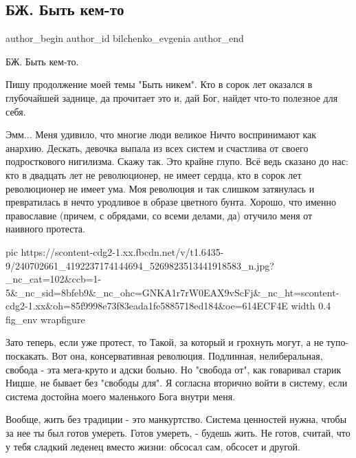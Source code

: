  
 
 
 
 
 
\subsection{БЖ. Быть кем-то}
\label{sec:27_08_2021.fb.bilchenko_evgenia.2.bytj_kem_to}
 
\ifcmt
 author_begin
   author_id bilchenko_evgenia
 author_end
\fi

БЖ. Быть кем-то.

Пишу продолжение моей темы "Быть никем". Кто в сорок лет оказался в глубочайшей
заднице, да прочитает это и, дай Бог, найдет что-то полезное для себя. 

Эмм... Меня удивило, что многие люди великое Ничто воспринимают как анархию.
Дескать, девочка выпала из всех систем и счастлива от своего подросткового
нигилизма. Скажу так. Это крайне глупо. Всё ведь сказано до нас: кто в двадцать
лет не революционер, не имеет сердца, кто в сорок лет революционер не имеет
ума. Моя революция и так слишком затянулась и превратилась в нечто уродливое в
образе цветного бунта. Хорошо, что именно православие (причем, с обрядами, со
всеми делами, да) отучило меня от наивного протеста.

\ifcmt
  pic https://scontent-cdg2-1.xx.fbcdn.net/v/t1.6435-9/240702661_4192237174144694_5269823513441918583_n.jpg?_nc_cat=102&ccb=1-5&_nc_sid=8bfeb9&_nc_ohc=GNKA1r7rW0EAX9vScFj&_nc_ht=scontent-cdg2-1.xx&oh=85f9998e73f83eada1fe5885718ed184&oe=614ECF4E
  width 0.4
	fig_env wrapfigure
\fi

Зато теперь, если уже протест, то Такой, за который и грохнуть могут, а не
тупо-поскакать. Вот она, консервативная революция. Подлинная, нелиберальная,
свобода - эта мега-круто и адски больно. Но "свобода от", как говаривал старик
Ницше, не бывает без "свободы для". Я согласна вторично войти в систему, если
система достойна моего маленького Бога внутри меня. 

Вообще, жить без традиции - это манкуртство. Система ценностей нужна, чтобы за
нее ты был готов умереть. Готов умереть, - будешь жить. Не готов, считай, что у
тебя сладкий леденец вместо жизни: обсосал сам, обсосет и другой.

